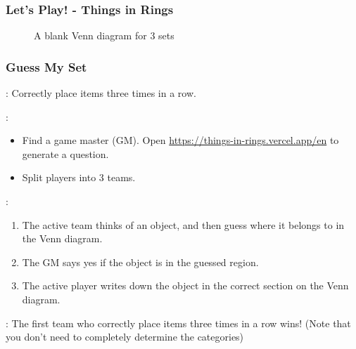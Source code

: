 \begin{frame}
\frametitle{Let's Play! - Things in Rings}
\begin{figure}[h!]
\caption{A blank Venn diagram for 3 sets}
\end{figure}
\end{frame}

\begin{frame}
\frametitle{Guess My Set}
: Correctly place items three times in a row.

: 
\begin{itemize}
\item Find a game master (GM). Open \href{https://things-in-rings.vercel.app/en}{https://things-in-rings.vercel.app/en} to generate a question.
\item Split players into 3 teams.
\end{itemize}
:
\begin{enumerate}
\item The active team thinks of an object, and then guess where it belongs to in the Venn diagram.
\item The GM says yes if the object is in the guessed region.
\item The active player writes down the object in the correct section on the Venn diagram.
\end{enumerate}
: The first team who correctly place items three times in a row wins! (Note that you don't need to completely determine the categories)
\end{frame}

\begin{frame}{}
\end{frame}

